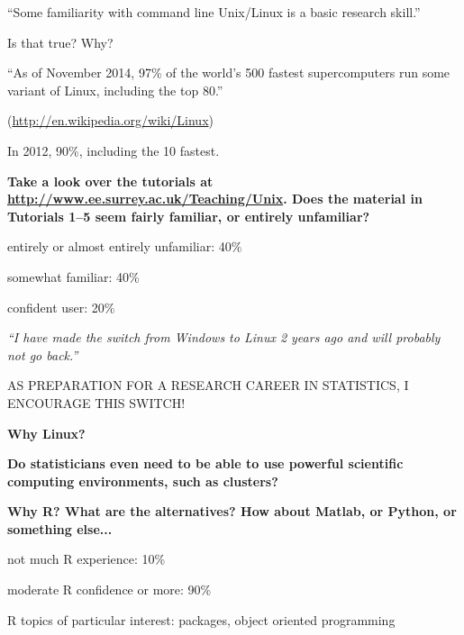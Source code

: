 \documentclass[portrait,11pt]{seminar}
\begin{document}
\bs
{\bf

``Some familiarity with command line Unix/Linux is a basic research skill.''
}
 
Is that true? Why?

\es
\bs
\bf

``As of November 2014, 97\% of the world's 500 fastest supercomputers run some variant of Linux, including the top 80.''


(\url{http://en.wikipedia.org/wiki/Linux})

In 2012,  90\%, including the 10 fastest.

\es

\bs \bf
Take a look over the tutorials at \url{http://www.ee.surrey.ac.uk/Teaching/Unix}. Does the material in Tutorials 1--5 seem fairly familiar, or entirely unfamiliar?

\normalfont
entirely or almost entirely unfamiliar: 40\%

somewhat familiar: 40\% 

confident user: 20\%

\es

\bs
\medskip

{\it ``I have made the switch from Windows to Linux 2 years ago and will probably not go back.''} 

\medskip

AS PREPARATION FOR A RESEARCH CAREER IN STATISTICS, I ENCOURAGE THIS SWITCH!

\es

\bs
\bf Why Linux?

\es

\bs
\bf Do statisticians even need to be able to use powerful scientific computing environments, such as clusters?

\es

\bs
{\bf Why R? What are the alternatives? How about Matlab, or Python, or something else...
}
\medskip

not much R experience: 10\%

moderate R confidence or more: 90\%

\es


\bs 

R topics of particular interest: packages, object oriented programming
\end{document}
